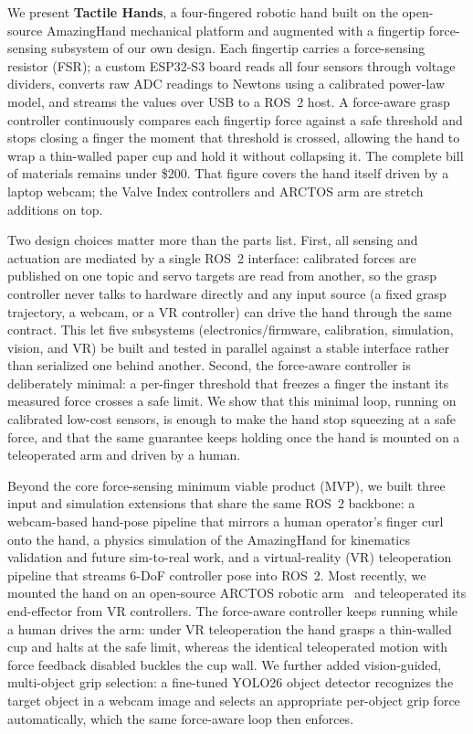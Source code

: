 \documentclass[acmlarge,screen,nonacm]{acmart}
\begin{document}
We present \textbf{Tactile Hands}, a four-fingered robotic hand built on the
open-source AmazingHand mechanical platform and augmented with a fingertip
force-sensing subsystem of our own design. Each fingertip carries a
force-sensing resistor (FSR); a custom ESP32-S3 board reads all four sensors
through voltage dividers, converts raw ADC readings to Newtons using a
calibrated power-law model, and streams the values over USB to a ROS~2 host. A
force-aware grasp controller continuously compares each fingertip force against
a safe threshold and stops closing a finger the moment that threshold is
crossed, allowing the hand to wrap a thin-walled paper cup and hold it without
collapsing it. The complete bill of materials remains under \$200. That figure
covers the hand itself driven by a laptop webcam; the Valve Index controllers
and ARCTOS arm are stretch additions on top.

Two design choices matter more than the parts list.
First, all sensing and actuation are mediated by a single ROS~2 interface:
calibrated forces are published on one topic and servo targets are read from
another, so the grasp controller never talks to hardware directly and any input
source (a fixed grasp trajectory, a webcam, or a VR controller) can drive the
hand through the same contract. This let five subsystems (electronics/firmware,
calibration, simulation, vision, and VR) be built and tested in parallel against
a stable interface rather than serialized one behind another. Second, the
force-aware controller is deliberately minimal: a per-finger threshold that
freezes a finger the instant its measured force crosses a safe limit. We show
that this minimal loop, running on calibrated low-cost sensors, is enough to make
the hand stop squeezing at a safe force, and that the same guarantee keeps
holding once the hand is mounted on a teleoperated arm and driven by a human.

Beyond the core force-sensing minimum viable product (MVP), we built three
input and simulation extensions that share the same ROS~2 backbone: a
webcam-based hand-pose pipeline that mirrors a human operator's finger curl onto
the hand, a physics simulation of the AmazingHand for kinematics validation and
future sim-to-real work, and a virtual-reality (VR) teleoperation pipeline that
streams 6-DoF controller pose into ROS~2. Most recently, we mounted the hand on
an open-source ARCTOS robotic arm~\cite{arctos2024} and teleoperated its
end-effector from VR controllers. The force-aware controller keeps
running while a human drives the arm: under VR teleoperation the hand grasps a
thin-walled cup and halts at the safe limit, whereas the identical
teleoperated motion with force feedback disabled buckles the cup wall. We
further added vision-guided, multi-object grip selection: a fine-tuned YOLO26
object detector recognizes the target object in a webcam image and selects an
appropriate per-object grip force automatically, which the same force-aware loop
then enforces.
\end{document}
